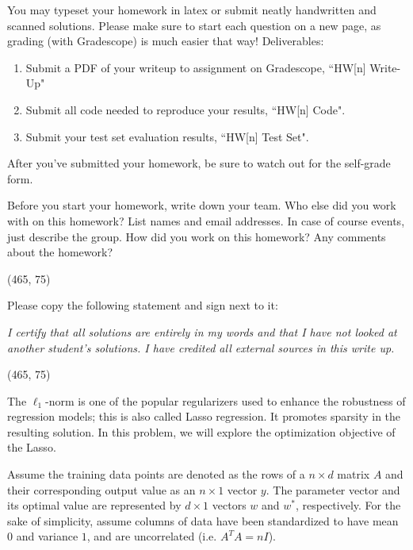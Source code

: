 
You may typeset your homework in latex or submit neatly handwritten and scanned solutions. Please make sure to start each question on a new page, as grading (with Gradescope) is much easier that way! Deliverables:

\begin{enumerate}
  \item Submit a PDF of your writeup to assignment on Gradescope, ``HW[n] Write-Up"
  \item Submit all code needed to reproduce your results, ``HW[n] Code".
  \item Submit your test set evaluation results, ``HW[n] Test Set".
\end{enumerate}

After you've submitted your homework, be sure to watch out for the self-grade form.

\begin{Parts}

\Part Before you start your homework, write down your team. Who else did you work with on this homework? List names and email addresses. In case of course events, just describe the group. How did you work on this homework? Any comments about the homework?

\vspace{15pt}
\framebox(465, 75){}

\Part Please copy the following statement and sign next to it:

\textit{I certify that all solutions are entirely in my words and that I have not looked at another student's solutions. I have credited all external sources in this write up.}

\vspace{15pt}
\framebox(465, 75){}

\end{Parts}

\pagebreak

The $\ell_1$-norm is one of the popular regularizers used to enhance the robustness of regression models; this is also called Lasso regression. It promotes sparsity in the resulting solution. In this problem, we will explore the optimization objective of the Lasso.

Assume the training data points are denoted as the rows of a $n\times d$ matrix $A$ and their corresponding output value as an $n\times 1$ vector ${y}$. The parameter vector and its optimal value are represented by $d\times 1$ vectors $w$ and $w^*$, respectively. For the sake of simplicity, assume columns of data have been standardized to have mean $0$ and variance $1$, and are uncorrelated (i.e. $A^TA=nI$).

